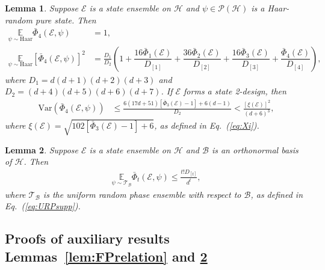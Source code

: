 \documentclass[aps,pra,twocolumn,nofootinbib,superscriptaddress,10pt]{revtex4-2}
\newtheorem{lemma}{Lemma}
\newcommand{\Ha}{\mathrm{Haar}}
\newcommand{\Var}{\mathrm{Var}}
\newcommand{\bbE}{\mathbb{E}}
\newcommand{\caB}{\mathcal{B}}
\newcommand{\caE}{\mathcal{E}}
\newcommand{\caH}{\mathcal{H}}
\newcommand{\caP}{\mathcal{P}}
\newcommand{\caT}{\mathcal{T}}
\newcommand{\bPhi}{\bar{\Phi}}
\newcommand{\eref}[1]{Eq.~\textup{(\ref{#1})}}
\newcommand{\lsref}[2]{Lemmas~\ref{#1} and \ref{#2}}
\begin{document}
\begin{lemma}\label{lem:4th_poten}
Suppose $\caE$ is a state ensemble on $\caH$ and $\psi \in \caP(\caH)$ is a Haar-random pure state. Then
\begin{align}
     \underset{\psi\sim \Ha}{\bbE} \bPhi_4(\caE,\psi)&=1, \label{eq:4th_moment}\\
   \underset{\psi\sim \Ha}{\bbE} \left[\bPhi_4(\caE,\psi)\right]^2&=\frac{D_1}{D_2}\left(1+\dfrac{16\bPhi_1(\caE)}{D_{[1]}}+\dfrac{36\bPhi_2(\caE)}{D_{[2]}}+\dfrac{16\bPhi_3(\caE)}{D_{[3]}}+\dfrac{\bPhi_4(\caE)}{D_{[4]}}\right), \label{eq:4th_squared}
\end{align}
where $D_1=d(d+1)(d+2)(d+3)$ and $D_2=(d+4)(d+5)(d+6)(d+7)$. If $\caE$ forms a state 2-design, then
\begin{align}
\Var(\bPhi_4(\caE,\psi))&\le\frac{6(17d+51)[\bPhi_3(\caE)-1]+6(d-1)}{D_2}<\frac{[\xi(\caE)]^2}{(d+6)^3}, \label{eq:4th_mo_var}
\end{align}
where $\xi(\caE)=\sqrt{102[\bPhi_3(\caE)-1]+6}$, as defined in \eref{eq:Xi}.
\end{lemma}

\begin{lemma}\label{lem:RP_URP}
Suppose $\caE$ is a state ensemble on $\caH$ and $\caB$ is an orthonormal basis of $\caH$. Then
\begin{align}
     \underset{\psi\sim \caT_\caB}{\bbE}\bPhi_t(\caE, \psi)\le\frac{t!D_{[t]}}{d^t},\label{eq:RP_URP}
\end{align}
where $\caT_\caB$ is the uniform random phase ensemble with respect to $\caB$, as defined in \eref{eq:URPsupp}.
\end{lemma}

\subsection{Proofs of auxiliary results \lsref{lem:FPrelation}{lem:RP_URP}}
\end{document}
